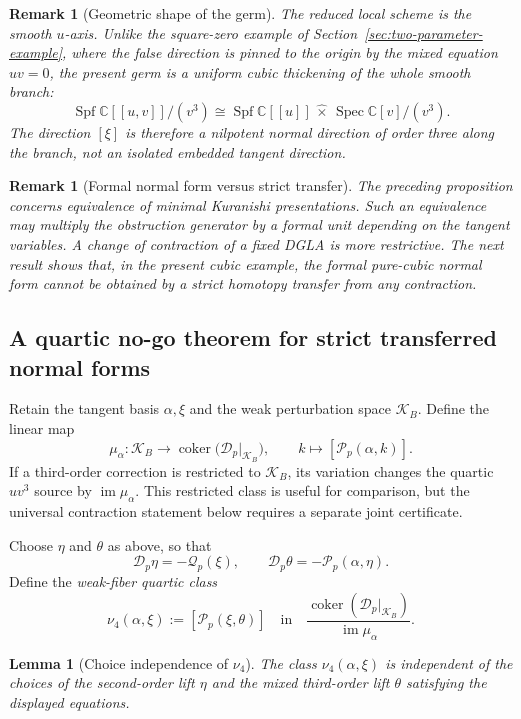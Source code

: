 \documentclass[11pt]{amsart}
\newtheorem{lemma}[theorem]{Lemma}
\newtheorem{remark}[theorem]{Remark}
\newcommand{\Spec}{\operatorname{Spec}}
\newcommand{\coker}{\operatorname{coker}}
\newcommand{\cD}{\mathscr D}
\newcommand{\cQ}{\mathscr Q}
\newcommand{\cP}{\mathscr P}
\newcommand{\C}{\mathbb C}
\newcommand{\Spf}{\operatorname{Spf}}
\begin{document}
\begin{remark}[Geometric shape of the germ]
The reduced local scheme is the smooth $u$-axis.  Unlike the square-zero example of Section~\ref{sec:two-parameter-example}, where the false direction is pinned to the origin by the mixed equation $uv=0$, the present germ is a uniform cubic thickening of the whole smooth branch:
\[
\Spf\C[[u,v]]/(v^3)
\cong
\Spf\C[[u]]\,\widehat\times\,\Spec\C[v]/(v^3).
\]
The direction $[\xi]$ is therefore a nilpotent normal direction of order three along the branch, not an isolated embedded tangent direction.
\end{remark}

\begin{remark}[Formal normal form versus strict transfer]
The preceding proposition concerns equivalence of minimal Kuranishi presentations.  Such an equivalence may multiply the obstruction generator by a formal unit depending on the tangent variables.  A change of contraction of a fixed DGLA is more restrictive.  The next result shows that, in the present cubic example, the formal pure-cubic normal form cannot be obtained by a strict homotopy transfer from any contraction.
\end{remark}

\subsection{A quartic no-go theorem for strict transferred normal forms}\label{subsec:strict-transfer-no-go}

Retain the tangent basis $\alpha,\xi$ and the weak perturbation space $\mathcal K_B$.  Define the linear map
\[
\mu_\alpha:\mathcal K_B\longrightarrow
\coker\bigl(\cD_p|_{\mathcal K_B}\bigr),
\qquad
k\longmapsto [\cP_p(\alpha,k)].
\]
If a third-order correction is restricted to $\mathcal K_B$, its variation
changes the quartic $uv^3$ source by $\operatorname{im}\mu_\alpha$.
This restricted class is useful for comparison, but the universal contraction
statement below requires a separate joint certificate.

Choose $\eta$ and $\theta$ as above, so that
\[
\cD_p\eta=-\cQ_p(\xi),
\qquad
\cD_p\theta=-\cP_p(\alpha,\eta).
\]
Define the \emph{weak-fiber quartic class}
\[
\boxed{
\nu_4(\alpha,\xi)
:=
[\cP_p(\xi,\theta)]
\quad\text{in}\quad
\frac{
\coker(\cD_p|_{\mathcal K_B})
}{\operatorname{im}\mu_\alpha}.
}
\]

\begin{lemma}[Choice independence of $\nu_4$]\label{lem:quartic-choice-independence}
The class $\nu_4(\alpha,\xi)$ is independent of the choices of the second-order lift $\eta$ and the mixed third-order lift $\theta$ satisfying the displayed equations.
\end{lemma}
\end{document}
